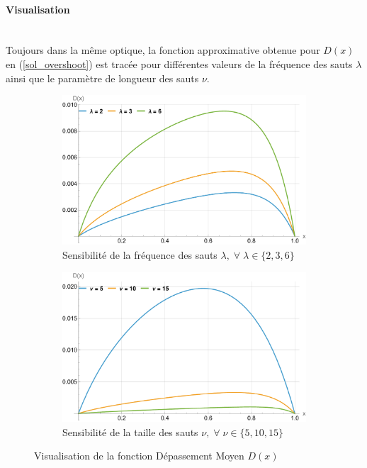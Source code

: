 \paragraph{Visualisation}\phantom{}\\
Toujours dans la même optique, la fonction approximative obtenue pour $D(x)$ en (\ref{sol_overshoot}) est tracée pour différentes valeurs de la fréquence des sauts $\lambda$ ainsi que le paramètre de longueur des sauts $\nu$.
\begin{figure}[htb]
    \centering
    \begin{subfigure}{0.45\linewidth}
        \includegraphics[width=\linewidth]{img/validation/Ovs/overshoot_lambda.pdf}
        \caption{Sensibilité de la fréquence des sauts $\lambda,\;\forall\;\lambda\in\{2,3,6\}$}\label{fig:Overshoot_lambda_visualisation}
    \end{subfigure}
    \hfill
    \begin{subfigure}{0.45\linewidth}
        \includegraphics[width=\linewidth]{img/validation/Ovs/overshoot_nu.pdf}
        \caption{Sensibilité de la taille des sauts $\nu,\;\forall\;\nu\in\{5,10,15\}$}\label{fig:Overshoot_nu_visualisation}
    \end{subfigure}
    \hfill
    \caption{Visualisation de la fonction Dépassement Moyen $D(x)$}\label{fig:OvershootVisualisation}
\end{figure}
